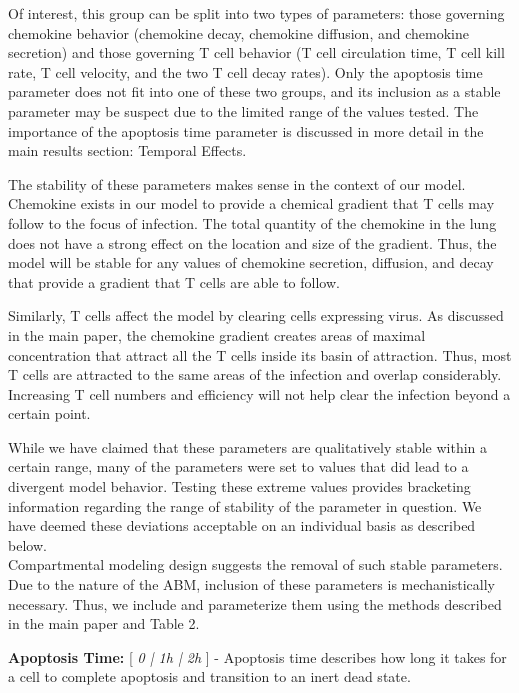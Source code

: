 \documentclass[10pt]{article}
\begin{document}
Of interest, this group can be split into two types of parameters: those governing chemokine behavior (chemokine decay, chemokine diffusion, and chemokine secretion) and those governing T cell behavior (T cell circulation time, T cell kill rate, T cell velocity, and the two T cell decay rates).  Only the apoptosis time parameter does not fit into one of these two groups, and its inclusion as a stable parameter may be suspect due to the limited range of the values tested.  The importance of the apoptosis time parameter is discussed in more detail in the main results section: Temporal Effects.  

The stability of these parameters makes sense in the context of our model.  Chemokine exists in our model to provide a chemical gradient that T cells may follow to the focus of infection.  The total quantity of the chemokine in the lung does not have a strong effect on the location and size of the gradient.  Thus, the model will be stable for any values of chemokine secretion, diffusion, and decay that provide a gradient that T cells are able to follow.

Similarly, T cells affect the model by clearing cells expressing virus.  As discussed in the main paper, the chemokine gradient creates areas of maximal concentration that attract all the T cells inside its basin of attraction.  Thus, most T cells are attracted to the same areas of the infection and overlap considerably.  Increasing T cell numbers and efficiency will not help clear the infection beyond a certain point.

While we have claimed that these parameters are qualitatively stable within a certain range, many of the parameters were set to values that did lead to a divergent model behavior.  Testing these extreme values provides bracketing information regarding the range of stability of the parameter in question.  We have deemed these deviations acceptable on an individual basis as described below. \\

Compartmental modeling design suggests the removal of such stable parameters.  Due to the nature of the ABM, inclusion of these parameters is mechanistically necessary.  Thus, we include and parameterize them using the methods described in the main paper and Table 2.

\textbf{Apoptosis Time:} [ \textit{0 | 1h | 2h} ] - Apoptosis time describes how long it takes for a cell to complete apoptosis and transition to an inert dead state.  
\end{document}

